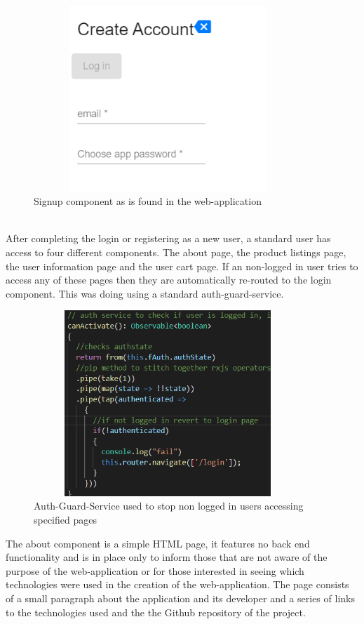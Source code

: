 \begin{figure}[h!]
    	\caption{Signup component as is found in the web-application}
	\centering
	\includegraphics[width=0.9\textwidth, height=7cm]{images/signup.png}
\end{figure}

\\
After completing the login or registering as a new user, a standard user has access to four different components. The about page, the product listings page, the user information page and the user cart page. If an non-logged in user tries to access any of these pages then they are automatically re-routed to the login component. This was doing using a standard auth-guard-service. 

\begin{figure}[h!]
    	\caption{Auth-Guard-Service used to stop non logged in users accessing specified pages}
	\centering
	\includegraphics[width=0.9\textwidth, height=7cm]{images/authguard.png}
\end{figure}

\newpage
The about component is a simple HTML page, it features no back end functionality and is in place only to inform those that are not aware of the purpose of the web-application or for those interested in seeing which technologies were used in the creation of the web-application. The page consists of a small paragraph about the application and its developer and a series of links to the technologies used and the the Github repository of the project. 

